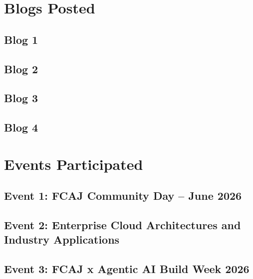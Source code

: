 

\newpage

\section{Blogs Posted}



\subsection{Blog 1}


\subsection{Blog 2}


\subsection{Blog 3}


\subsection{Blog 4}


\newpage

\section{Events Participated}



\subsection{Event 1: FCAJ Community Day – June 2026}


\subsection{Event 2: Enterprise Cloud Architectures and Industry Applications}


\subsection{Event 3: FCAJ x Agentic AI Build Week 2026}



